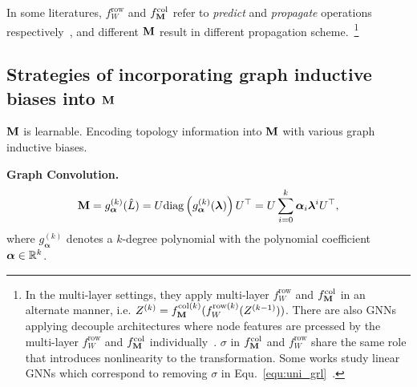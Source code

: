 \documentclass{article} %
\def\valpha{{\bm\alpha}}
\def\vlambda{{\bm\lambda}}
\begin{document}
	In some literatures, $f_W^{\mathrm{row}}$ and $f_{{\mathbf{M}}}^{\mathrm{col}}$ refer to \emph{predict} and \emph{propagate} operations respectively~\citep{klicpera_predict_2019}, and different ${\mathbf{M}}$ result in different propagation scheme.~\footnote{
		In the multi-layer settings, they apply multi-layer $f_W^{\mathrm{row}}$ and $f_{{\mathbf{M}}}^{\mathrm{col}}$ in an alternate manner, i.e. $Z^{(k)}=f_{{\mathbf{M}}}^{\mathrm{col}(k)}(f_W^{\mathrm{row}(k)}(Z^{(k-1)}))$.
		There are also GNNs applying decouple architectures where node features are prcessed by the multi-layer $f_W^{\mathrm{row}}$ and $f_{{\mathbf{M}}}^{\mathrm{col}}$ individually~\citep{klicpera_predict_2019,pmlr-v97-wu19e,klicpera_predict_2019,liu2020towards,zhu2020simple,zhang2021litegem}.
		$\sigma$ in $f_{{\mathbf{M}}}^{\mathrm{col}}$ and $f_W^{\mathrm{row}}$ share the same role that introduces nonlinearity to the transformation.
		Some works study linear GNNs which correspond to removing $\sigma$ in Equ.~\ref{equ:uni_grl}~\citep{pmlr-v97-wu19e,xu2021optimization,JacobiConv,liu2021eignn,liu2022mgnni}.
	}
	
	
	\subsection{Strategies of incorporating graph inductive biases into ${\mathbf{M}}$}
	
	${\mathbf{M}}$ is learnable.
	Encoding topology information into ${\mathbf{M}}$ with various graph inductive biases.
	
	\textbf{Graph Convolution.}
	\begin{equation}
		\begin{aligned}
			\rmM=g_{\valpha}^{(k)}(\hat L)=U\mathrm{diag}\left(g_{\valpha}^{(k)}(\vlambda)\right)U^{\top}=U\sum_{i=0}^k\valpha_i\vlambda^iU^{\top},
		\end{aligned}
	\end{equation}
	where $g_{\valpha}^{(k)}$ denotes a $k$-degree polynomial with the polynomial coefficient $\valpha\in\sR^k$.
	
\end{document}
